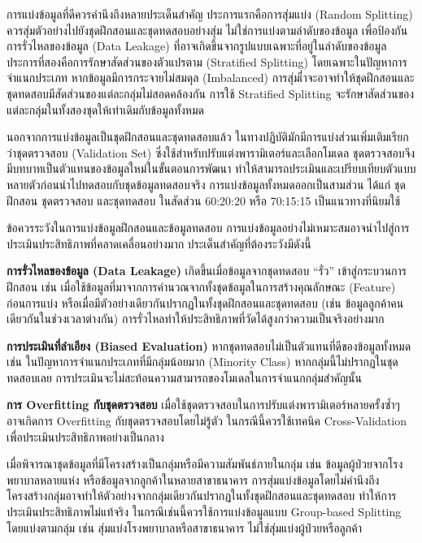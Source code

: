 การแบ่งข้อมูลที่ดีควรคำนึงถึงหลายประเด็นสำคัญ ประการแรกคือการสุ่มแบ่ง (Random Splitting) ควรสุ่มตัวอย่างไปยังชุดฝึกสอนและชุดทดสอบอย่างสุ่ม ไม่ใช่การแบ่งตามลำดับของข้อมูล เพื่อป้องกันการรั่วไหลของข้อมูล (Data Leakage) ที่อาจเกิดขึ้นจากรูปแบบเฉพาะที่อยู่ในลำดับของข้อมูล ประการที่สองคือการรักษาสัดส่วนของตัวแปรตาม (Stratified Splitting) โดยเฉพาะในปัญหาการจำแนกประเภท หากข้อมูลมีการกระจายไม่สมดุล (Imbalanced) การสุ่มเื่าจะอาจทำให้ชุดฝึกสอนและชุดทดสอบมีสัดส่วนของแต่ละกลุ่มไม่สอดคล้องกัน การใช้ Stratified Splitting จะรักษาสัดส่วนของแต่ละกลุ่มในทั้งสองชุดให้เท่าเดิมกับข้อมูลทั้งหมด

นอกจากการแบ่งข้อมูลเป็นชุดฝึกสอนและชุดทดสอบแล้ว ในทางปฏิบัติมักมีการแบ่งส่วนเพิ่มเติมเรียกว่าชุดตรวจสอบ (Validation Set) ซึ่งใช้สำหรับปรับแต่งพารามิเตอร์และเลือกโมเดล ชุดตรวจสอบจึงมีบทบาทเป็นตัวแทนของข้อมูลใหม่ในขั้นตอนการพัฒนา ทำให้สามารถประเมินและเปรียบเทียบตัวแบบหลายตัวก่อนนำไปทดสอบกับชุดข้อมูลทดสอบจริง การแบ่งข้อมูลทั้งหมดออกเป็นสามส่วน ได้แก่ ชุดฝึกสอน ชุดตรวจสอบ และชุดทดสอบ ในสัดส่วน 60:20:20 หรือ 70:15:15 เป็นแนวทางที่นิยมใช้

\begin{myBox}[]{ข้อควรระวังในการแบ่งข้อมูลฝึกสอนและข้อมูลทดสอบ}{}
การแบ่งข้อมูลอย่างไม่เหมาะสมอาจนำไปสู่การประเมินประสิทธิภาพที่คลาดเคลื่อนอย่างมาก ประเด็นสำคัญที่ต้องระวังมีดังนี้

\textbf{การรั่วไหลของข้อมูล (Data Leakage)} เกิดขึ้นเมื่อข้อมูลจากชุดทดสอบ ``รั่ว'' เข้าสู่กระบวนการฝึกสอน เช่น เมื่อใช้ข้อมูลที่มาจากการคำนวณจากทั้งชุดข้อมูลในการสร้างคุณลักษณะ (Feature) ก่อนการแบ่ง หรือเมื่อมีตัวอย่างเดียวกันปรากฏในทั้งชุดฝึกสอนและชุดทดสอบ (เช่น ข้อมูลลูกค้าคนเดียวกันในช่วงเวลาต่างกัน) การรั่วไหลทำให้ประสิทธิภาพที่วัดได้สูงกว่าความเป็นจริงอย่างมาก

\textbf{การประเมินที่ลำเอียง (Biased Evaluation)} หากชุดทดสอบไม่เป็นตัวแทนที่ดีของข้อมูลทั้งหมด เช่น ในปัญหาการจำแนกประเภทที่มีกลุ่มน้อยมาก (Minority Class) หากกลุ่มนี้ไม่ปรากฏในชุดทดสอบเลย การประเมินจะไม่สะท้อนความสามารถของโมเดลในการจำแนกกลุ่มสำคัญนั้น

\textbf{การ Overfitting กับชุดตรวจสอบ} เมื่อใช้ชุดตรวจสอบในการปรับแต่งพารามิเตอร์หลายครั้งซ้ำๆ อาจเกิดการ Overfitting กับชุดตรวจสอบโดยไม่รู้ตัว ในกรณีนี้ควรใช้เทคนิค Cross-Validation เพื่อประเมินประสิทธิภาพอย่างเป็นกลาง
\end{myBox}

เมื่อพิจารณาชุดข้อมูลที่มีโครงสร้างเป็นกลุ่มหรือมีความสัมพันธ์ภายในกลุ่ม เช่น ข้อมูลผู้ป่วยจากโรงพยาบาลหลายแห่ง หรือข้อมูลจากลูกค้าในหลายสาขาธนาคาร การสุ่มแบ่งข้อมูลโดยไม่คำนึงถึงโครงสร้างกลุ่มอาจทำให้ตัวอย่างจากกลุ่มเดียวกันปรากฏในทั้งชุดฝึกสอนและชุดทดสอบ ทำให้การประเมินประสิทธิภาพไม่แท้จริง ในกรณีเช่นนี้ควรใช้การแบ่งข้อมูลแบบ Group-based Splitting โดยแบ่งตามกลุ่ม เช่น สุ่มแบ่งโรงพยาบาลหรือสาขาธนาคาร ไม่ใช่สุ่มแบ่งผู้ป่วยหรือลูกค้า

